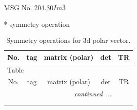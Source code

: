 \documentclass[fleqn,8pt]{jsarticle}
\begin{document}
\setcounter{MaxMatrixCols}{32}

\renewcommand{\tablename}{Table~}
\renewcommand{\figurename}{Figure~}
\begin{center}
\LARGE
MSG No. 204.30\quad$Im\bar{3}$
\end{center}
* symmetry operation
\renewcommand{\arraystretch}{1.3}
\begin{longtable}{ccccc}
\caption{Symmetry operations for 3d polar vector.}
 \\
 \hline \hline
No. & tag & matrix (polar) & det & TR \\ \hline \endfirsthead

\multicolumn{4}{l}{\tablename\ \thetable{}} \\
 \hline \hline
No. & tag & matrix (polar) & det & TR \\ \hline \endhead

 \hline \hline
\multicolumn{4}{r}{\footnotesize\it continued ...} \\ \endfoot

 \hline \hline
\multicolumn{4}{r}{} \\ \endlastfoot


\end{longtable}
\end{document}
